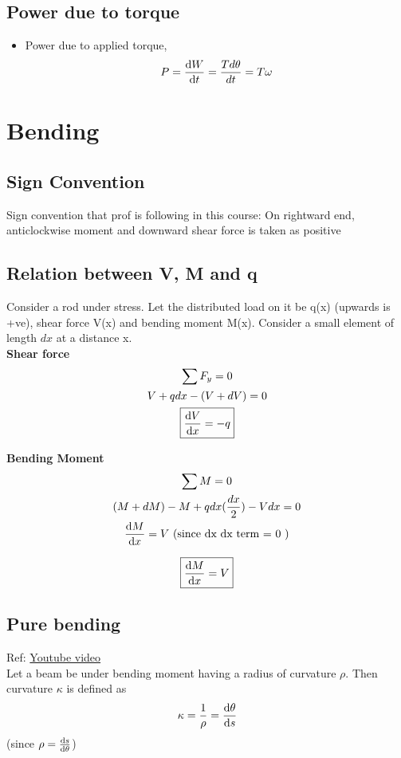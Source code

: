 \documentclass{article}
\begin{document}
	\subsection{Power due to torque}
	\begin{itemize}
		\item Power due to applied torque,
		\[P = \dv{W}{t} = \frac{Td\theta}{dt} = T\omega\]

	\end{itemize}


\section{Bending}

	\subsection{Sign Convention}
		Sign convention that prof is following in this course: On rightward end, anticlockwise moment and downward shear force is taken as positive


	\subsection{Relation between V, M and q}
		Consider a rod under stress. Let the distributed load on it be q(x) (upwards is +ve), shear force V(x) and bending moment M(x). Consider a small element of length $dx$ at a distance x. \\

		\noindent \textbf{Shear force}
		\begin{gather*}
			\sum F_y = 0\\
			V + q dx - (V+dV) =0 \\ %
			\boxed{\dv{V}{x} = - q}
		\end{gather*}

		\noindent \textbf{Bending Moment}
		\begin{gather*}
			\sum M = 0 \\
			(M + dM) - M + qdx (\frac{dx}{2}) - Vdx =0\\
			\dv{M}{x} = V \text{      (since dx dx term = 0 )}
		\end{gather*}

		\[\boxed{\dv{M}{x} = V}\]


	\subsection{Pure bending}
		Ref: \href{https://www.youtube.com/watch?v=f08Y39UiC-o}{Youtube video}\\
		Let a beam be under bending moment having a radius of curvature $\rho$. Then curvature $\kappa$ is defined as
		\[\kappa = \frac{1}{\rho} = \dv{\theta}{s}\]
		(since $\rho = \dv{s}{\theta}$)\\
\end{document}
